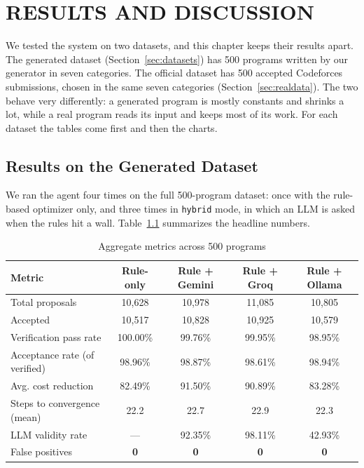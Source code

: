 \documentclass[12pt,a4paper]{report}
\begin{document}
\chapter{RESULTS AND DISCUSSION}

We tested the system on two datasets, and this chapter keeps their results apart. The generated dataset (Section~\ref{sec:datasets}) has 500 programs written by our generator in seven categories. The official dataset has 500 accepted Codeforces submissions, chosen in the same seven categories (Section~\ref{sec:realdata}). The two behave very differently: a generated program is mostly constants and shrinks a lot, while a real program reads its input and keeps most of its work. For each dataset the tables come first and then the charts.

\section{Results on the Generated Dataset}
\label{sec:genresults}

We ran the agent four times on the full 500-program dataset: once with the rule-based optimizer only, and three times in \texttt{hybrid} mode, in which an LLM is asked when the rules hit a wall. Table~\ref{tab:metrics} summarizes the headline numbers.

\begin{table}[H]
\centering
\caption{Aggregate metrics across 500 programs}
\label{tab:metrics}
\small
\setlength{\tabcolsep}{4pt}
\begin{tabular}{|l|c|c|c|c|}
\hline
\textbf{Metric} & \textbf{Rule-only} & \textbf{Rule + Gemini} & \textbf{Rule + Groq} & \textbf{Rule + Ollama} \\
\hline
Total proposals & 10,628 & 10,978 & 11,085 & 10,805 \\
\hline
Accepted & 10,517 & 10,828 & 10,925 & 10,579 \\
\hline
Verification pass rate & 100.00\% & 99.76\% & 99.95\% & 98.95\% \\
\hline
Acceptance rate (of verified) & 98.96\% & 98.87\% & 98.61\% & 98.94\% \\
\hline
Avg. cost reduction & 82.49\% & 91.50\% & 90.89\% & 83.28\% \\
\hline
Steps to convergence (mean) & 22.2 & 22.7 & 22.9 & 22.3 \\
\hline
LLM validity rate & --- & 92.35\% & 98.11\% & 42.93\% \\
\hline
False positives & \textbf{0} & \textbf{0} & \textbf{0} & \textbf{0} \\
\hline
\end{tabular}
\end{table}
\end{document}
